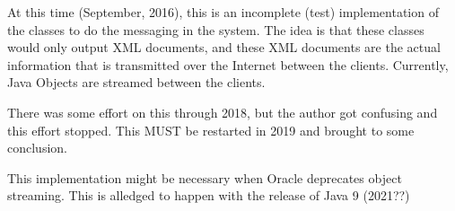 At this time (September, 2016), this is an incomplete (test) implementation of the classes to do the messaging in the system. The idea is that these classes would only output X\-M\-L documents, and these X\-M\-L documents are the actual information that is transmitted over the Internet between the clients. Currently, Java Objects are streamed between the clients. 

There was some effort on this through 2018, but the author got confusing and this effort stopped. This M\-U\-S\-T be restarted in 2019 and brought to some conclusion. 

This implementation might be necessary when Oracle deprecates object streaming. This is alledged to happen with the release of Java 9 (2021??) 